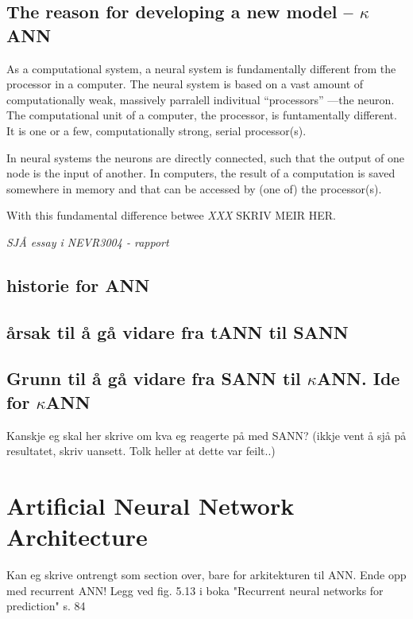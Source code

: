 \subsection{The reason for developing a new model -- $\kappa$ANN}
As a computational system, a neural system is fundamentally different from the processor in a computer. 
The neural system is based on a vast amount of computationally weak, massively parralell indivitual ``processors'' ---the neuron. 
The computational unit of a computer, the processor, is funtamentally different. It is one or a few, computationally strong, serial processor(s). 

In neural systems the neurons are directly connected, such that the output of one node is the input of another. In computers, the result of a computation is saved somewhere in memory and that can be accessed by (one of) the processor(s).

With this fundamental difference betwee  \emph{XXX} SKRIV MEIR HER.



\newpage
		\emph{SJÅ essay i NEVR3004 - rapport}

	\subsection{historie for ANN}


	\subsection{årsak til å gå vidare fra tANN til SANN}
	\subsection{Grunn til å gå vidare fra SANN til $\kappa$ANN. Ide for $\kappa$ANN}
		Kanskje eg skal her skrive om kva eg  reagerte på med SANN? (ikkje vent å sjå på resultatet, skriv uansett. Tolk heller at dette var feilt..)

\section{Artificial Neural Network Architecture}
Kan eg skrive ontrengt som section over, bare for arkitekturen til ANN. Ende opp med recurrent ANN!
Legg ved fig. 5.13 i boka "Recurrent neural networks for prediction" s. 84






